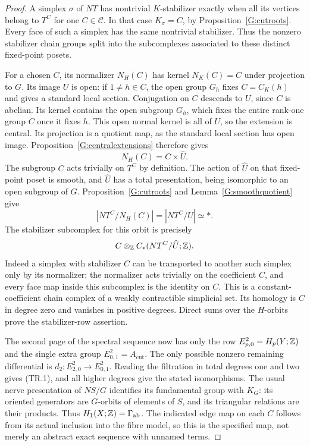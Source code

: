 \begin{proof}
A simplex $\sigma$ of $NT$ has nontrivial $K$-stabilizer exactly
when all its vertices belong to $T^C$ for one $C\in\mathscr C$.
In that case $K_\sigma=C$, by Proposition~\ref{G:cutroots}.
Every face of such a simplex has the same nontrivial stabilizer.
Thus the nonzero stabilizer chain groups split into the
subcomplexes associated to these distinct fixed-point posets.

For a chosen $C$, its normalizer $N_H(C)$ has kernel
$N_K(C)=C$ under projection to $G$. Its image $U$ is open:
if $1\ne h\in C$, the open group $G_h$ fixes $C=C_K(h)$
and gives a standard local section. Conjugation on $C$
descends to $U$, since $C$ is abelian. Its kernel contains
the open subgroup $G_h$, which fixes the entire rank-one
group $C$ once it fixes $h$. This open normal kernel is all
of $U$, so the extension is central. Its projection is a
quotient map, as the standard local section has open image.
Proposition~\ref{G:centralextensions} therefore gives
\[
 N_H(C)=C\times\widehat U.
\]
The subgroup $C$ acts trivially on $T^C$ by definition.
The action of $\widehat U$ on that fixed-point poset is smooth,
and $\widehat U$ has a total presentation, being isomorphic to
an open subgroup of $G$. Proposition~\ref{G:cutroots} and
Lemma~\ref{G:smoothquotient} give
\[
 |NT^C/N_H(C)|=|NT^C/\widehat U|\simeq *.
\]
The stabilizer subcomplex for this orbit is precisely
\[
 C\otimes_{\mathbb Z} C_*(NT^C/\widehat U;\mathbb Z).
\]
Indeed a simplex with stabilizer $C$ can be transported to
another such simplex only by its normalizer; the normalizer
acts trivially on the coefficient $C$, and every face map
inside this subcomplex is the identity on $C$.
This is a constant-coefficient chain complex of a weakly
contractible simplicial set. Its homology is $C$ in degree
zero and vanishes in positive degrees. Direct sums over the
$H$-orbits prove the stabilizer-row assertion.

The second page of the spectral sequence now has only the
row $E^2_{p,0}=H_p(Y;\mathbb Z)$ and the single extra group
$E^2_{0,1}=A_{\mathrm{cut}}$. The only possible nonzero
remaining differential is
$d_2:E^2_{2,0}\to E^2_{0,1}$. Reading the filtration in total
degrees one and two gives (TR.1), and all higher degrees give
the stated isomorphisms. The usual nerve presentation of
$NS/G$ identifies its fundamental group with $K_G$: its
oriented generators are $G$-orbits of elements of $S$, and
its triangular relations are their products. Thus
$H_1(X;\mathbb Z)=\Gamma_{\mathrm{ab}}$. The indicated edge map on each
$C$ follows from its actual inclusion into the fibre model,
so this is the specified map, not merely an abstract exact
sequence with unnamed terms.
\end{proof}


